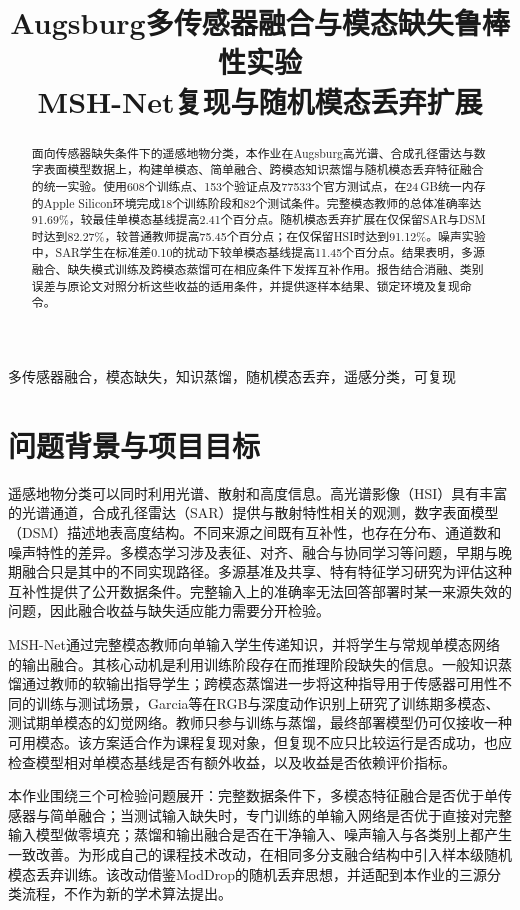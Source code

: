\documentclass[conference,10pt]{IEEEtran}
\title{Augsburg多传感器融合与模态缺失鲁棒性实验\\MSH-Net复现与随机模态丢弃扩展}
\begin{document}
\maketitle
\begin{abstract}
\normalfont\small\mdseries
面向传感器缺失条件下的遥感地物分类，本作业在Augsburg高光谱、合成孔径雷达与数字表面模型数据上，构建单模态、简单融合、跨模态知识蒸馏与随机模态丢弃特征融合的统一实验。使用608个训练点、153个验证点及77533个官方测试点，在24\,GB统一内存的Apple Silicon环境完成18个训练阶段和82个测试条件。完整模态教师的总体准确率达91.69\%，较最佳单模态基线提高2.41个百分点。随机模态丢弃扩展在仅保留SAR与DSM时达到82.27\%，较普通教师提高75.45个百分点；在仅保留HSI时达到91.12\%。噪声实验中，SAR学生在标准差0.10的扰动下较单模态基线提高11.45个百分点。结果表明，多源融合、缺失模式训练及跨模态蒸馏可在相应条件下发挥互补作用。报告结合消融、类别误差与原论文对照分析这些收益的适用条件，并提供逐样本结果、锁定环境及复现命令。
\end{abstract}
\begin{IEEEkeywords}
\normalfont\small\mdseries
多传感器融合，模态缺失，知识蒸馏，随机模态丢弃，遥感分类，可复现
\end{IEEEkeywords}

\section{问题背景与项目目标}
遥感地物分类可以同时利用光谱、散射和高度信息。高光谱影像（HSI）具有丰富的光谱通道，合成孔径雷达（SAR）提供与散射特性相关的观测，数字表面模型（DSM）描述地表高度结构。不同来源之间既有互补性，也存在分布、通道数和噪声特性的差异。多模态学习涉及表征、对齐、融合与协同学习等问题，早期与晚期融合只是其中的不同实现路径\cite{baltrusaitis2019}。多源基准及共享、特有特征学习研究为评估这种互补性提供了公开数据条件\cite{hong2021}。完整输入上的准确率无法回答部署时某一来源失效的问题，因此融合收益与缺失适应能力需要分开检验。

MSH-Net通过完整模态教师向单输入学生传递知识，并将学生与常规单模态网络的输出融合\cite{wei2023}。其核心动机是利用训练阶段存在而推理阶段缺失的信息。一般知识蒸馏通过教师的软输出指导学生\cite{hinton2015}；跨模态蒸馏进一步将这种指导用于传感器可用性不同的训练与测试场景，Garcia等在RGB与深度动作识别上研究了训练期多模态、测试期单模态的幻觉网络\cite{garcia2018}。教师只参与训练与蒸馏，最终部署模型仍可仅接收一种可用模态。该方案适合作为课程复现对象，但复现不应只比较运行是否成功，也应检查模型相对单模态基线是否有额外收益，以及收益是否依赖评价指标。

本作业围绕三个可检验问题展开：完整数据条件下，多模态特征融合是否优于单传感器与简单融合；当测试输入缺失时，专门训练的单输入网络是否优于直接对完整输入模型做零填充；蒸馏和输出融合是否在干净输入、噪声输入与各类别上都产生一致改善。为形成自己的课程技术改动，在相同多分支融合结构中引入样本级随机模态丢弃训练。该改动借鉴ModDrop的随机丢弃思想\cite{neverova2015}，并适配到本作业的三源分类流程，不作为新的学术算法提出。
\end{document}
